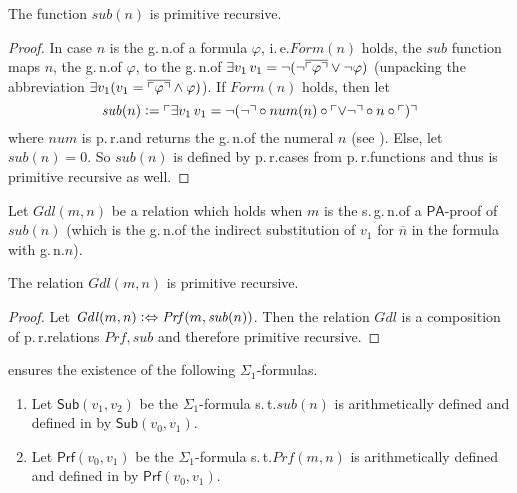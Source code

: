 \begin{thm}
The function $\mathit{sub}(n)$ is primitive recursive. 
\end{thm}
\begin{proof}
In case $n$ is the g.\,n.\@ of a formula $\varphi$, i.\,e.\@ $\mathit{Form}(n)$ holds, the $\mathit{sub}$ function maps $n$, the g.\,n.\@ of $\varphi$, to the g.\,n.\@ of $ \exists v_1  \, v_1 = \lnot (\lnot  \overline{\ulcorner \varphi \urcorner} \vee \lnot \varphi ) $ (unpacking the abbreviation $\exists v_1  ( v_1 =  \overline{\ulcorner \varphi \urcorner} \wedge \varphi )  $). If $\mathit{Form}(n)$ holds, then let \[\mathit{sub}(n) \vcentcolon= \ulcorner \exists v_1  \, v_1 = \lnot (\lnot \urcorner  \circ num(n) \circ \ulcorner \vee \lnot\urcorner \circ n \circ \ulcorner)\urcorner \] where $\mathit{num}$ is p.\,r.\@ and returns the g.\,n.\@ of the numeral $n$ (see ). Else, let $\mathit{sub}(n) = 0$. So $\mathit{sub}(n)$ is defined by p.\,r.\@ cases from p.\,r.\@ functions and thus is primitive recursive as well.
\end{proof}

\begin{dfn}
Let $\mathit{Gdl}(m,n)$ be a relation which holds when $m$ is the s.\,g.\,n.\@ of a $\mathsf{PA}$-proof of $\mathit{sub}(n)$ (which is the g.\,n.\@ of the indirect substitution of $v_1$ for $\overline{n}$ in the formula with g.\,n.\@ $n$).
\end{dfn}

\begin{thm}
The relation $\mathit{Gdl}(m,n)$ is primitive recursive.
\end{thm}

\begin{proof}
Let $\mathit{Gdl}(m,n) \vcentcolon \Leftrightarrow \mathit{Prf}(m, \mathit{sub}(n))$. Then the relation $\mathit{Gdl}$ is a composition of p.\,r.\@ relations $\mathit{Prf}, \mathit{sub}$ and therefore primitive recursive.
\end{proof}

\begin{dfn}

 ensures the existence of the following $\Sigma_1$-formulas.
\begin{enumerate}
\item Let $\mathsf{Sub}(v_1,v_2)$ be the $\Sigma_1$-formula s.\,t.\@ $\mathit{sub}(n)$ is arithmetically defined and defined in \PA by $\mathsf{Sub}(v_0,v_1)$.
\item Let $\mathsf{Prf}(v_0,v_1)$ be the $\Sigma_1$-formula s.\,t.\@ $\mathit{Prf}(m,n)$ is arithmetically defined and defined in \PA by $\mathsf{Prf}(v_0,v_1)$.
\end{enumerate}
\end{dfn}


